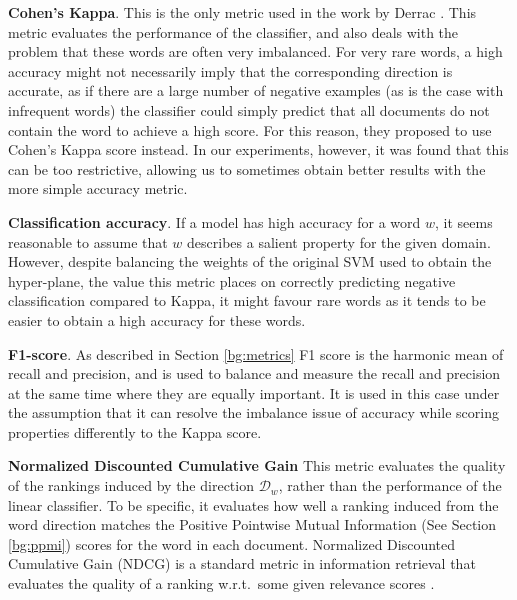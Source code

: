 
\noindent

\noindent \textbf{Cohen's Kappa}. This is the only metric used in the work by Derrac \cite{Derrac2015}. This metric evaluates the performance of the classifier, and also deals with the problem that these words are often very imbalanced. For very rare words, a high accuracy might not necessarily imply that the corresponding direction is accurate, as if there are a large number of negative examples (as is the case with infrequent words) the classifier could simply predict that all documents do not contain the word to achieve a high score. For this reason, they proposed to use Cohen's Kappa score instead. In our experiments, however, it was found that this can be too restrictive, allowing us to sometimes obtain better results with the more simple accuracy metric.\smallskip %
\smallskip

 \textbf{Classification accuracy}. If a model has high accuracy for a word $w$, it seems reasonable to assume that $w$ describes a salient property for the given domain. However, despite balancing the weights of the original SVM used to obtain the hyper-plane, the value this metric places on correctly predicting negative classification  compared to Kappa, it might favour rare words as it tends to be easier to obtain a high accuracy for these words.%
\smallskip

\textbf{F1-score}. As described in Section \ref{bg:metrics} F1 score is the harmonic mean of recall and precision, and is used to balance and measure the recall and precision at the same time where they are equally important. It is used in this case under the assumption that it can resolve the imbalance issue of accuracy while scoring properties differently to the Kappa score. 

\noindent \textbf{Normalized Discounted Cumulative Gain}\label{ch3:NDCG} %
This metric evaluates the quality of the rankings induced by the direction $\mathcal{D}_w$, rather than the performance of the linear classifier. To be specific, it evaluates how well a ranking induced from the word direction matches the Positive Pointwise Mutual Information (See Section \ref{bg:ppmi}) scores for the word in each document.  Normalized Discounted Cumulative Gain (NDCG) is a standard metric in information retrieval that evaluates the quality of a ranking w.r.t.\ some given relevance scores \cite{jarvelin2002cumulated}.  


